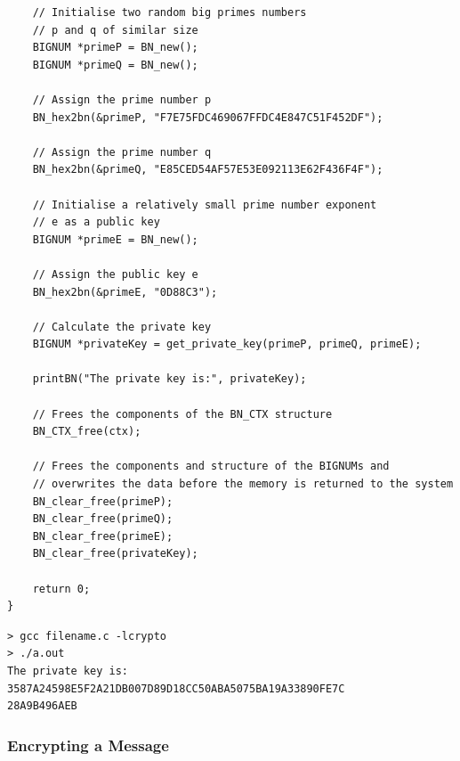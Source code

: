 \documentclass[12pt]{article}
\begin{document}
\begin{lstlisting}
    // Initialise two random big primes numbers 
    // p and q of similar size
    BIGNUM *primeP = BN_new();
    BIGNUM *primeQ = BN_new();

    // Assign the prime number p
    BN_hex2bn(&primeP, "F7E75FDC469067FFDC4E847C51F452DF");

    // Assign the prime number q
    BN_hex2bn(&primeQ, "E85CED54AF57E53E092113E62F436F4F");

    // Initialise a relatively small prime number exponent
    // e as a public key
    BIGNUM *primeE = BN_new();

    // Assign the public key e
    BN_hex2bn(&primeE, "0D88C3");

    // Calculate the private key
    BIGNUM *privateKey = get_private_key(primeP, primeQ, primeE);

    printBN("The private key is:", privateKey);

    // Frees the components of the BN_CTX structure
    BN_CTX_free(ctx);

    // Frees the components and structure of the BIGNUMs and
    // overwrites the data before the memory is returned to the system
    BN_clear_free(primeP);
    BN_clear_free(primeQ);
    BN_clear_free(primeE);
    BN_clear_free(privateKey);

    return 0;
}    
\end{lstlisting}

\begin{framed}
    \begin{verbatim}
> gcc filename.c -lcrypto
> ./a.out
The private key is: 3587A24598E5F2A21DB007D89D18CC50ABA5075BA19A33890FE7C
28A9B496AEB
    \end{verbatim}
\end{framed}

\newpage

\subsubsection{Encrypting a Message}
\end{document}
